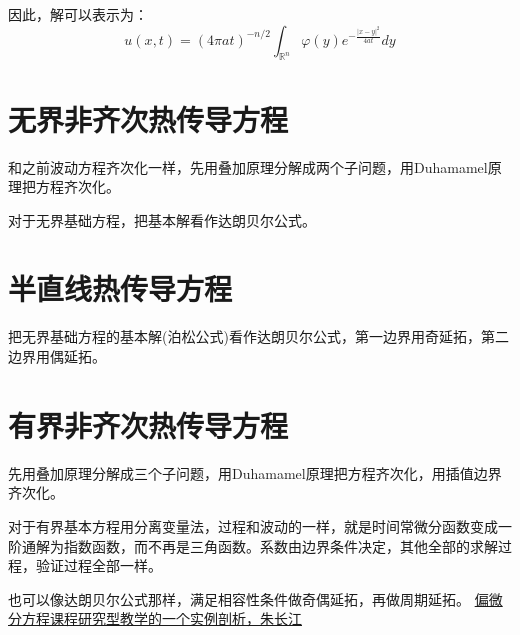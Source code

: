 \documentclass[12pt,a4paper]{article}
\numberwithin{subsection}{section}   %
\numberwithin{subsubsection}{subsection}
\theoremstyle{plain}
\theoremstyle{definition}
\theoremstyle{remark}
\theoremstyle{remark}
\begin{document}
	
	
	
	
	因此，解可以表示为：
	\begin{equation}
		u(x, t) = (4\pi a t)^{-n/2} \int_{\mathbb{R}^n} \varphi(y) e^{-\frac{|x - y|^2}{4a t}} dy
	\end{equation}
	

	
		\newpage
	\section{无界非齐次热传导方程}
	和之前波动方程齐次化一样，先用叠加原理分解成两个子问题，用Duhamamel原理把方程齐次化。
	
	对于无界基础方程，把基本解看作达朗贝尔公式。
	
	\section{半直线热传导方程}
	把无界基础方程的基本解(泊松公式)看作达朗贝尔公式，第一边界用奇延拓，第二边界用偶延拓。
	
	
	\section{有界非齐次热传导方程}
	先用叠加原理分解成三个子问题，用Duhamamel原理把方程齐次化，用插值边界齐次化。
	
	对于有界基本方程用分离变量法，过程和波动的一样，就是时间常微分函数变成一阶通解为指数函数，而不再是三角函数。系数由边界条件决定，其他全部的求解过程，验证过程全部一样。
	
	也可以像达朗贝尔公式那样，满足相容性条件做奇偶延拓，再做周期延拓。
	\href{https://kns.cnki.net/kcms2/article/abstract?v=VQ0ntgfwFMTzN6hnFDpFMFM9DxAtYwMQhco2QSA-IEHGx9q5EylUyfVfvJ65vLbYgxi4GKWYtrw0WYFjulce4L-QdEJiwrbko6gMtLg1u_v-yZO9l1KqPNK5VVy0WXMK_iyRkdOb_3JYM79j78dC5ZO49R0B00eT_N_tEe4_tT88MKGKuKknjw==&uniplatform=NZKPT&language=CHS}{偏微分方程课程研究型教学的一个实例剖析，朱长江}
	
	
	
	
	
\end{document}
